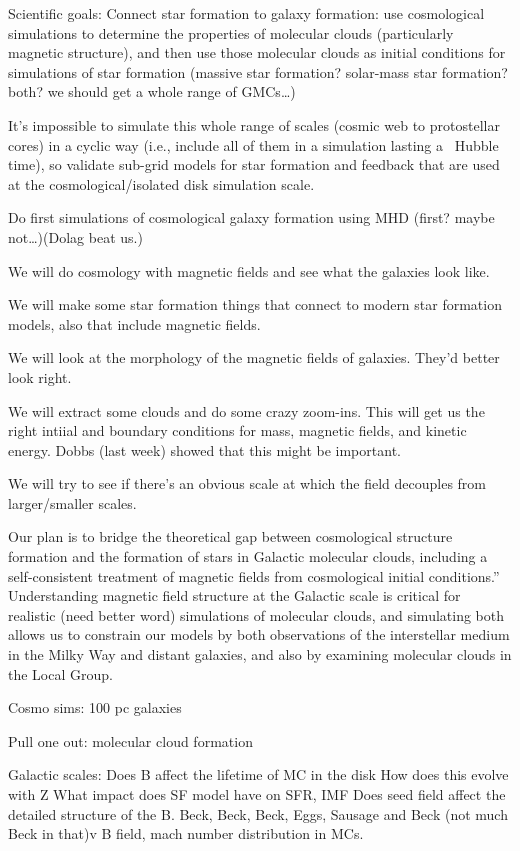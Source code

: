 

Scientific goals:
Connect star formation to galaxy formation: use cosmological simulations to
determine the properties of molecular clouds (particularly magnetic structure),
and then use those molecular clouds as initial conditions for simulations of
star formation (massive star formation?  solar-mass star formation?  both? we
should get a whole range of GMCs…)

It’s impossible to simulate this whole range of scales (cosmic web to
protostellar cores) in a cyclic way (i.e., include all of them in a simulation
lasting a ~Hubble time), so validate sub-grid models for star formation and
feedback that are used at the cosmological/isolated disk simulation scale.

Do first simulations of cosmological galaxy formation using MHD (first?  maybe
not…)(Dolag beat us.)

\citep{Beck12}

We will do cosmology with magnetic fields and see what the galaxies look like.

We will make some star formation things that connect to modern star formation
models, also that include magnetic fields.

We will look at the morphology of the magnetic fields of galaxies.  They'd
better look right.

We will extract some clouds and do some crazy zoom-ins.  This will get us the
right intiial and boundary conditions for mass, magnetic fields, and kinetic
energy.  Dobbs (last week) showed that this might be important.

We will try to see if there's an obvious scale at which the field decouples from
larger/smaller scales.

Our plan is to bridge the theoretical gap between cosmological structure
formation and the formation of stars in Galactic molecular clouds, including a
self-consistent treatment of magnetic fields from cosmological initial
conditions.”  Understanding magnetic field structure at the Galactic scale is
critical for realistic (need better word) simulations of molecular clouds, and
simulating both allows us to constrain our models by both observations of the
interstellar medium in the Milky Way and distant galaxies, and also by examining
molecular clouds in the Local Group. 



Cosmo sims: 100 pc galaxies

Pull one out: molecular cloud formation

Galactic scales:
Does B affect the lifetime of MC in the disk
How does this evolve with Z
What impact does SF model have on SFR, IMF
Does seed field affect the detailed structure of the B. Beck, Beck, Beck, Eggs,
Sausage and Beck (not much Beck in that)v
B field, mach number distribution in MCs.
